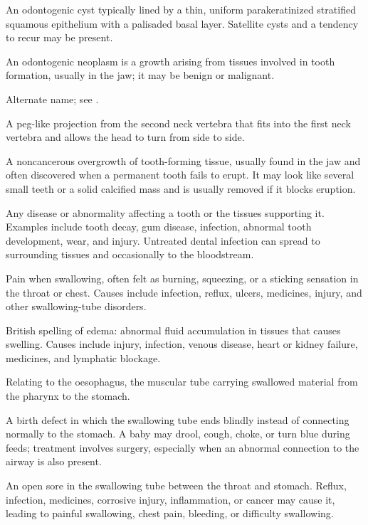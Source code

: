  An odontogenic cyst typically lined by a thin, uniform parakeratinized stratified squamous epithelium with a palisaded basal layer. Satellite cysts and a tendency to recur may be present.

 An odontogenic neoplasm is a growth arising from tissues involved in tooth formation, usually in the jaw; it may be benign or malignant.

 Alternate name; see .

 A peg-like projection from the second neck vertebra that fits into the first neck vertebra and allows the head to turn from side to side.

 A noncancerous overgrowth of tooth-forming tissue, usually found in the jaw and often discovered when a permanent tooth fails to erupt. It may look like several small teeth or a solid calcified mass and is usually removed if it blocks eruption.

 Any disease or abnormality affecting a tooth or the tissues supporting it. Examples include tooth decay, gum disease, infection, abnormal tooth development, wear, and injury. Untreated dental infection can spread to surrounding tissues and occasionally to the bloodstream.

 Pain when swallowing, often felt as burning, squeezing, or a sticking sensation in the throat or chest. Causes include infection, reflux, ulcers, medicines, injury, and other swallowing-tube disorders.

 British spelling of edema: abnormal fluid accumulation in tissues that causes swelling. Causes include injury, infection, venous disease, heart or kidney failure, medicines, and lymphatic blockage.

 Relating to the oesophagus, the muscular tube carrying swallowed material from the pharynx to the stomach.

 A birth defect in which the swallowing tube ends blindly instead of connecting normally to the stomach. A baby may drool, cough, choke, or turn blue during feeds; treatment involves surgery, especially when an abnormal connection to the airway is also present.

 An open sore in the swallowing tube between the throat and stomach. Reflux, infection, medicines, corrosive injury, inflammation, or cancer may cause it, leading to painful swallowing, chest pain, bleeding, or difficulty swallowing.

